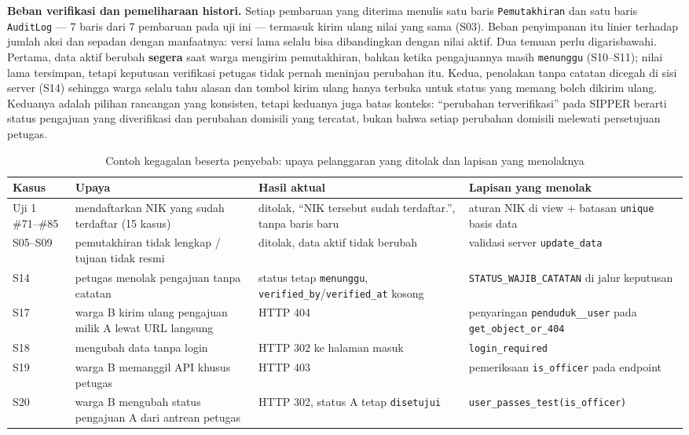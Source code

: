 \documentclass[11pt,a4paper]{article}
\begin{document}
\textbf{Beban verifikasi dan pemeliharaan histori.} Setiap pembaruan yang diterima menulis satu baris \texttt{Pemutakhiran} dan satu baris \texttt{AuditLog} --- 7 baris dari 7 pembaruan pada uji ini --- termasuk kirim ulang nilai yang sama (S03). Beban penyimpanan itu linier terhadap jumlah aksi dan sepadan dengan manfaatnya: versi lama selalu bisa dibandingkan dengan nilai aktif. Dua temuan perlu digarisbawahi. Pertama, data aktif berubah \textbf{segera} saat warga mengirim pemutakhiran, bahkan ketika pengajuannya masih \texttt{menunggu} (S10--S11); nilai lama tersimpan, tetapi keputusan verifikasi petugas tidak pernah meninjau perubahan itu. Kedua, penolakan tanpa catatan dicegah di sisi server (S14) sehingga warga selalu tahu alasan dan tombol kirim ulang hanya terbuka untuk status yang memang boleh dikirim ulang. Keduanya adalah pilihan rancangan yang konsisten, tetapi keduanya juga batas konteks: ``perubahan terverifikasi'' pada SIPPER berarti status pengajuan yang diverifikasi dan perubahan domisili yang tercatat, bukan bahwa setiap perubahan domisili melewati persetujuan petugas.

\begin{table}[htbp]
\centering
\footnotesize
\renewcommand{\arraystretch}{1.25}
\begin{tabular}{@{}p{3.0cm}p{5.2cm}p{4.4cm}p{3.4cm}@{}}
\toprule
\textbf{Kasus} & \textbf{Upaya} & \textbf{Hasil aktual} & \textbf{Lapisan yang menolak} \\
\midrule
Uji 1 \#71--\#85 & mendaftarkan NIK yang sudah terdaftar (15 kasus) & ditolak, ``NIK tersebut sudah terdaftar.'', tanpa baris baru & aturan NIK di view + batasan \texttt{unique} basis data \\
S05--S09 & pemutakhiran tidak lengkap / tujuan tidak resmi & ditolak, data aktif tidak berubah & validasi server \texttt{update\_data} \\
S14 & petugas menolak pengajuan tanpa catatan & status tetap \texttt{menunggu}, \texttt{verified\_by}/\texttt{verified\_at} kosong & \texttt{STATUS\_WAJIB\_CATATAN} di jalur keputusan \\
S17 & warga B kirim ulang pengajuan milik A lewat URL langsung & HTTP 404 & penyaringan \texttt{penduduk\_\_user} pada \texttt{get\_object\_or\_404} \\
S18 & mengubah data tanpa login & HTTP 302 ke halaman masuk & \texttt{login\_required} \\
S19 & warga B memanggil API khusus petugas & HTTP 403 & pemeriksaan \texttt{is\_officer} pada endpoint \\
S20 & warga B mengubah status pengajuan A dari antrean petugas & HTTP 302, status A tetap \texttt{disetujui} & \texttt{user\_passes\_test(is\_officer)} \\
\bottomrule
\end{tabular}
\caption{Contoh kegagalan beserta penyebab: upaya pelanggaran yang ditolak dan lapisan yang menolaknya}
\label{tab:t3}
\end{table}
\end{document}
